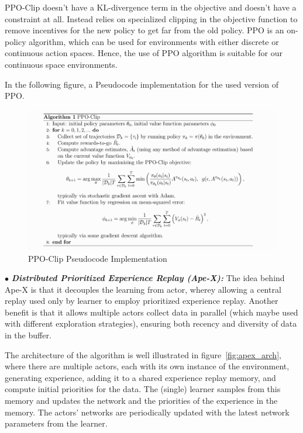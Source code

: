PPO-Clip doesn’t have a KL-divergence term in the objective and doesn’t have a constraint at all. Instead relies on specialized clipping in the objective function to remove incentives for the new policy to get far from the old policy. PPO is an on-policy algorithm, which can be used for environments with either discrete or continuous action spaces. Hence, the use of PPO algorithm is suitable for our continuous space environments.

In the following figure, a Pseudocode implementation for the used version of PPO.
\begin{figure}[!htb]
		\centering
		\includegraphics[width=\linewidth]{figures/ppo.png}
		\caption{PPO-Clip Pseudocode Implementation}
		\label{fig:ppo_algorithm}
\end{figure}


$\bullet$ \textit{\textbf{Distributed Prioritized Experience Replay (Ape-X):}} The idea behind Ape-X is that it decouples the learning from actor, wherey allowing a central replay used only by learner to employ prioritized experience replay. Another benefit is that it allows multiple actors collect data in parallel (which maybe used with different exploration strategies), ensuring both recency and diversity of data in the buffer. 

The architecture of the algorithm is well illustrated in figure~\ref{fig:apex_arch}, where there are multiple actors, each with its own instance of the environment, generating experience, adding it to a shared experience replay memory, and compute initial priorities for the data. The (single) learner samples from this memory and updates the network and the priorities of the experience in the memory. The actors’ networks are periodically updated with the latest network parameters from the learner.

